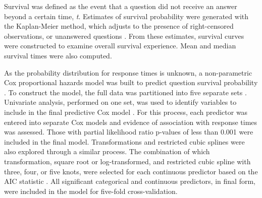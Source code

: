 \documentclass[]{interact}\usepackage[]{graphicx}\usepackage[]{color}
\begin{document}
Survival was defined as the event that a question did not receive an answer beyond a certain time, \textit{t}. Estimates of survival probability were generated with the Kaplan-Meier method, which adjusts to the presence of right-censored observations, or unanswered questions \cite{Bland1998}. From these estimates, survival curves were constructed to examine overall survival experience. Mean and median survival times were also computed. 

As the probability distribution for response times is unknown, a non-parametric Cox proportional hazards model was built to predict question survival probability \cite{Moore2010}. To construct the model, the full data was partitioned into five separate sets \cite{Rodriguez2010}. Univariate analysis, performed on one set, was used to identify variables to include in the final predictive Cox model \cite{Hammermeister1979}. For this process, each predictor was entered into separate Cox models and evidence of association with response times was assessed. Those with partial likelihood ratio p-values of less than 0.001 were included in the final model. Transformations and restricted cubic splines were also explored through a similar process. The combination of which transformation, square root or log-transformed, and restricted cubic spline with three, four, or five knots, were selected for each continuous predictor based on the AIC statistic \cite{Harrell2015}. All significant categorical and continuous predictors, in final form, were included in the model for five-fold cross-validation. 
\end{document}
